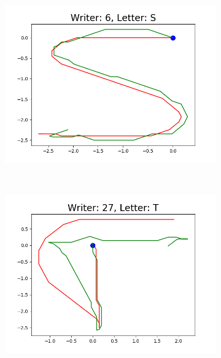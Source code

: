 \begin{figure}
\begin{subfigure}[b]{0.17\textwidth}
          \includegraphics[width=\textwidth]{images/framework/comparison_figures/S_6.png}
      \end{subfigure}
      ~
      \begin{subfigure}[b]{0.17\textwidth}
          \includegraphics[width=\textwidth]{images/framework/comparison_figures/T_27.png}
      \end{subfigure}
      ~
      \begin{subfigure}[b]{0.17\textwidth}

\end{subfigure}
\end{figure}
